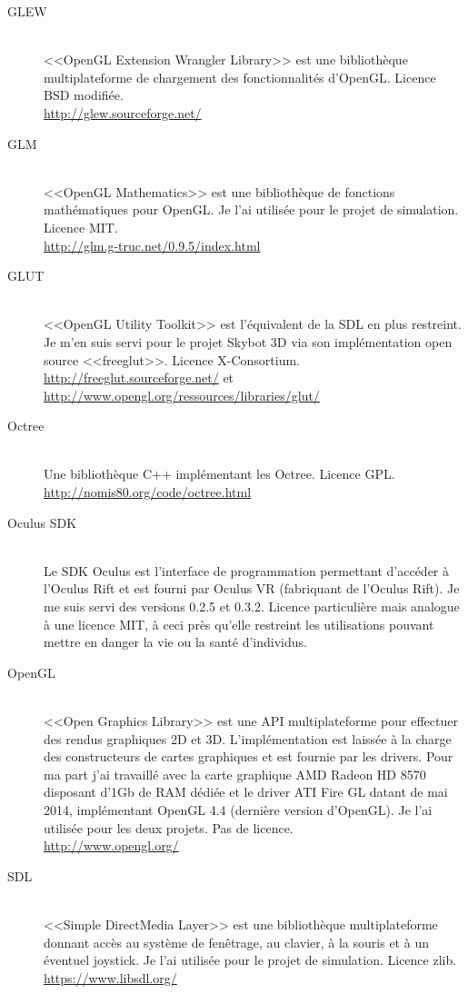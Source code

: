 \documentclass[a4paper,french,12pt]{article}
\begin{document}
		  \begin{description}
		  \item [GLEW]~\\
		      <<OpenGL Extension Wrangler Library>> est une bibliothèque multiplateforme de chargement des fonctionnalités d'OpenGL.
		      Licence BSD modifiée.\\
		      \url{http://glew.sourceforge.net/}
		  \item [GLM]~\\
		      <<OpenGL Mathematics>> est une bibliothèque de fonctions mathématiques pour OpenGL.
		      Je l'ai utilisée pour le projet de simulation.
		      Licence MIT.\\
		      \url{http://glm.g-truc.net/0.9.5/index.html}
		  \item [GLUT]~\\
		      <<OpenGL Utility Toolkit>> est l'équivalent de la SDL en plus restreint. Je m'en suis servi pour le 
		      projet Skybot 3D via son implémentation open source <<freeglut>>.
		      Licence X-Consortium.\\
		      \url{http://freeglut.sourceforge.net/} et \url{http://www.opengl.org/ressources/libraries/glut/}
		  \item [Octree]~\\
		      Une bibliothèque C++ implémentant les Octree.
		      Licence GPL.\\
		      \url{http://nomis80.org/code/octree.html}
		  \item [Oculus SDK]~\\
		      Le SDK Oculus est l'interface de programmation permettant d'accéder à l'Oculus Rift et est fourni
		      par Oculus VR (fabriquant de l'Oculus Rift). 
		      Je me suis servi des versions 0.2.5 et 0.3.2.
		      Licence particulière mais analogue à une licence MIT, à ceci près qu'elle restreint les utilisations
		      pouvant mettre en danger la vie ou la santé d'individus.
		  \item [OpenGL] ~\\
		      <<Open Graphics Library>> est une API multiplateforme pour effectuer des rendus graphiques 2D et 3D.
		      L'implémentation est laissée à la charge des constructeurs de cartes graphiques et est fournie
		      par les drivers. Pour ma part j'ai travaillé avec la carte graphique AMD Radeon HD 8570 disposant d'1Gb de RAM dédiée  
		      et le driver ATI Fire GL datant de mai 2014, implémentant OpenGL 4.4 (dernière version d'OpenGL).
		      Je l'ai utilisée pour les deux projets.
		      Pas de licence.\\
		      \url{http://www.opengl.org/}
		  \item [SDL]~\\
		      <<Simple DirectMedia Layer>> est une bibliothèque multiplateforme donnant accès au système de fenêtrage,
		      au clavier, à la souris et à un éventuel joystick. Je l'ai utilisée pour le projet de simulation.
		      Licence zlib.\\
		      \url{https://www.libsdl.org/}
		  \end{description}
\end{document}
